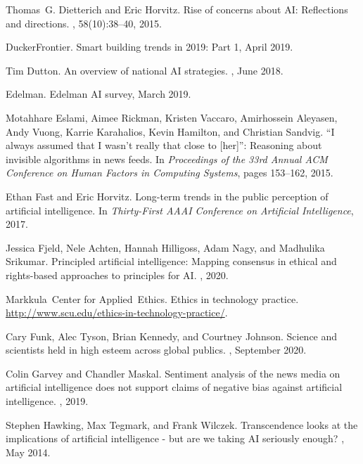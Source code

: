 \documentclass[11pt]{article} %
\begin{document}
\begin{thebibliography}{10}
Thomas~G. Dietterich and Eric Horvitz.
\newblock Rise of concerns about {AI}: Reflections and directions.
, 58(10):38--40, 2015.

DuckerFrontier.
\newblock Smart building trends in 2019: Part 1, April 2019.

Tim Dutton.
\newblock An overview of national {AI} strategies.
, June 2018.

Edelman.
 {E}delman {AI} survey, March 2019.

Motahhare Eslami, Aimee Rickman, Kristen Vaccaro, Amirhossein Aleyasen, Andy
  Vuong, Karrie Karahalios, Kevin Hamilton, and Christian Sandvig.
\newblock ``{I} always assumed that {I} wasn't really that close to [her]'':
  Reasoning about invisible algorithms in news feeds.
\newblock In {\em Proceedings of the 33rd Annual ACM Conference on Human
  Factors in Computing Systems}, pages 153--162, 2015.

Ethan Fast and Eric Horvitz.
\newblock Long-term trends in the public perception of artificial intelligence.
\newblock In {\em Thirty-First AAAI Conference on Artificial Intelligence},
  2017.

Jessica Fjeld, Nele Achten, Hannah Hilligoss, Adam Nagy, and Madhulika
  Srikumar.
\newblock Principled artificial intelligence: Mapping consensus in ethical and
  rights-based approaches to principles for {AI}.
, 2020.

Markkula~Center for Applied~Ethics.
\newblock Ethics in technology practice.
\newblock \url{http://www.scu.edu/ethics-in-technology-practice/}.

Cary Funk, Alec Tyson, Brian Kennedy, and Courtney Johnson.
\newblock Science and scientists held in high esteem across global publics.
, September 2020.

Colin Garvey and Chandler Maskal.
\newblock Sentiment analysis of the news media on artificial intelligence does
  not support claims of negative bias against artificial intelligence.
, 2019.

Stephen Hawking, Max Tegmark, and Frank Wilczek.
\newblock Transcendence looks at the implications of artificial intelligence -
  but are we taking {AI} seriously enough?
, May 2014.


\end{thebibliography}
\end{document}
